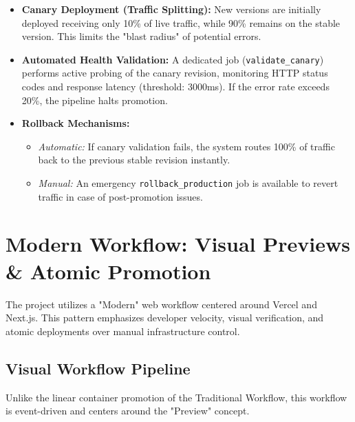 \documentclass[a4paper,12pt]{report}
\begin{document}
\begin{itemize}
    \item \textbf{Canary Deployment (Traffic Splitting):} New versions are initially deployed receiving only 10\% of live traffic, while 90\% remains on the stable version. This limits the "blast radius" of potential errors.
    \item \textbf{Automated Health Validation:} A dedicated job (\texttt{validate\_canary}) performs active probing of the canary revision, monitoring HTTP status codes and response latency (threshold: 3000ms). If the error rate exceeds 20\%, the pipeline halts promotion.
    \item \textbf{Rollback Mechanisms:}
    \begin{itemize}[label=-]
        \item \textit{Automatic:} If canary validation fails, the system routes 100\% of traffic back to the previous stable revision instantly.
        \item \textit{Manual:} An emergency \texttt{rollback\_production} job is available to revert traffic in case of post-promotion issues.
    \end{itemize}
\end{itemize}

\section{Modern Workflow: Visual Previews \& Atomic Promotion}

The project utilizes a "Modern" web workflow centered around Vercel and Next.js. This pattern emphasizes developer velocity, visual verification, and atomic deployments over manual infrastructure control.

\subsection{Visual Workflow Pipeline}
Unlike the linear container promotion of the Traditional Workflow, this workflow is event-driven and centers around the "Preview" concept.
\end{document}

